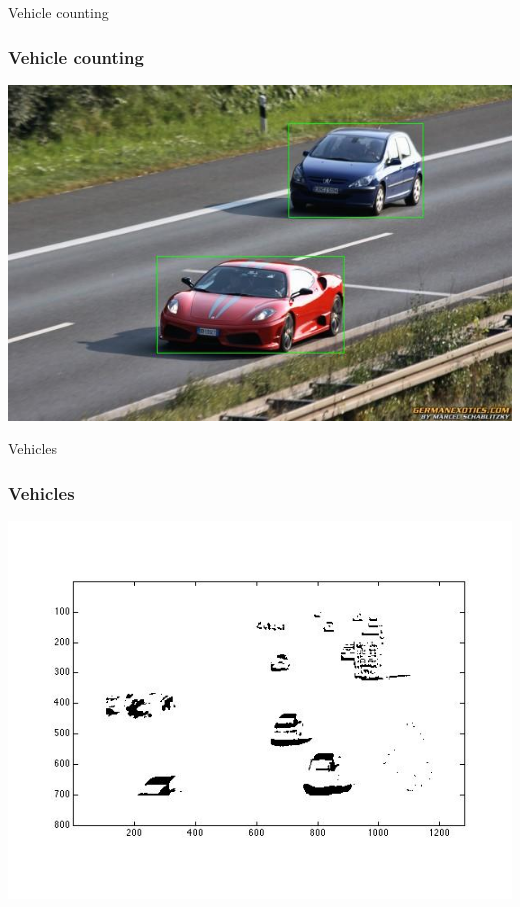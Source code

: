 \documentclass{beamer}
\begin{document}
\begin{frame}{Vehicle counting}
	\frametitle{Vehicle counting}
	\begin{center}
		\includegraphics[width= 0.8\linewidth]{images/cars.jpg}  
	\end{center}
\end{frame}



\begin{frame}{Vehicles}
	\frametitle{Vehicles}
	\begin{center}
		\includegraphics[width= 0.8\linewidth]{images/isolated_areas.jpg}  
	\end{center}
\end{frame}
\end{document}
